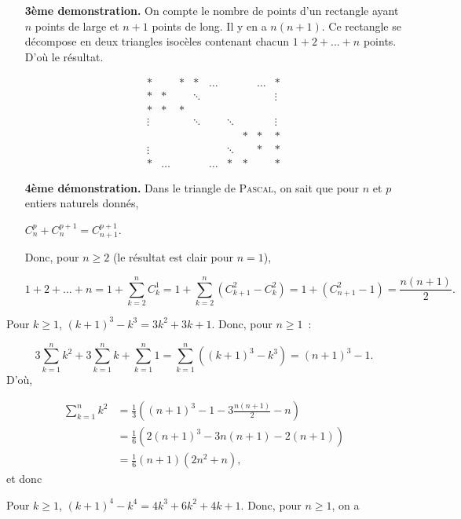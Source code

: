 {\begin{enumerate}
{\begin{itemize}
$$\begin{array}{ccccccccccccc}
1&+&2&+&3&+&\ldots&+&(n-1)&+&n&=&S\\
n&+&(n-1)&+&(n-2)&+&\ldots&+&2&+&1&=&S
\end{array}
$$
et en additionnant (verticalement), on obtient $2S=(n+1)+(n+1)+\ldots+(n+1)=n(n+1)$ d'où le résultat. La même
démonstration s'écrit avec le symbole
sigma~:~

$$2S=\sum_{k=1}^{n}k+\sum_{k=1}^{n}(n+1-k)=\sum_{k=1}^{n}(k+n+1-k)=\sum_{k=1}^{n}(n+1)=n(n+1).$$
\item[\textbf{3ème demonstration.}] On compte le nombre de points d'un rectangle ayant $n$ points de large et $n+1$
points de long. Il y en a $n(n+1)$. Ce rectangle se décompose en deux triangles isocèles contenant chacun $1+2+...+n$ 
points. D'où le résultat.

$$\begin{array}{ccccccccc}
{*}& &{*}&{*}&\ldots& & &\ldots&{*}\\
{*}&{*}& &\ddots& & & & &\vdots\\
{*}&{*}&{*}& & & & & & \\
\vdots& & &\ddots& &\ddots& & &\vdots\\
 & & & & & &{*}&{*}&{*}\\
\vdots& & & & &\ddots& &{*}&{*}\\
*&\ldots& & &\ldots&{*}&{*}& &{*}
\end{array}
$$
\item[\textbf{4ème démonstration.}] Dans le triangle de \textsc{Pascal}, on sait que pour $n$ et
$p$ entiers naturels donnés,

\begin{center}
$C_n^p+C_n^{p+1}=C_{n+1}^{p+1}$.
\end{center}
Donc, pour $n\geq2$ (le résultat est clair pour $n=1$),

$$1+2+...+n=1+\sum_{k=2}^{n}C_k^1=1+\sum_{k=2}^{n}\left(C_{k+1}^2-C_k^2\right)=1+(C_{n+1}^2-1)=\frac{n(n+1)}{2}.$$

\end{itemize}
Pour $k\geq1$, $(k+1)^3-k^3=3k^2+3k+1$. Donc, pour $n\geq1$~:

$$3\sum_{k=1}^{n}k^2+3\sum_{k=1}^{n}k+\sum_{k=1}^{n}1=\sum_{k=1}^{n}((k+1)^3-k^3)=(n+1)^3-1.$$
D'où,

\begin{align*}
\sum_{k=1}^{n}k^2 &= \frac{1}{3}\left((n+1)^3-1-3\frac{n(n+1)}{2}-n\right) \\
&= \frac{1}{6}(2(n+1)^3-3n(n+1)-2(n+1)) \\
&= \frac{1}{6}(n+1)(2n^2+n),
\end{align*}
et donc
\begin{center}
\end{center}
Pour $k\geq1$, $(k+1)^4-k^4=4k^3+6k^2+4k+1$. Donc, pour $n\geq1$, on a

}
\end{enumerate}}
